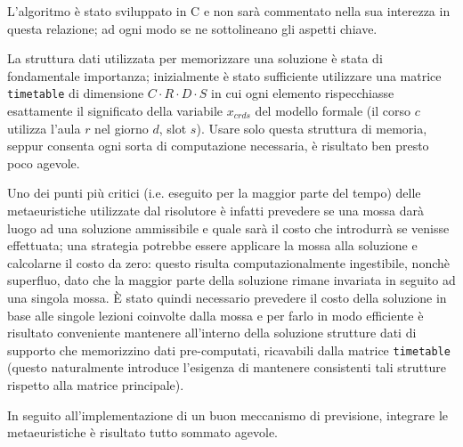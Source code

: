 \documentclass[]{article}
\newcommand{\E}{È }
\begin{document}
L'algoritmo è stato sviluppato in C e non sarà commentato nella sua interezza in questa relazione; ad ogni modo se ne sottolineano gli aspetti chiave.

La struttura dati utilizzata per memorizzare una soluzione è stata di fondamentale importanza; inizialmente è stato sufficiente utilizzare una matrice \texttt{timetable} di dimensione  $C \cdot R \cdot D \cdot S$ in cui ogni elemento rispecchiasse esattamente il significato della variabile $x_{crds}$ del modello formale (il corso $c$ utilizza l'aula $r$ nel giorno $d$, slot $s$). Usare solo questa struttura di memoria, seppur consenta ogni sorta di computazione necessaria, è risultato ben presto poco agevole.

Uno dei punti più critici (i.e. eseguito per la maggior parte del tempo) delle metaeuristiche utilizzate dal risolutore è infatti prevedere se una mossa darà luogo ad una soluzione ammissibile e quale sarà il costo che introdurrà se venisse effettuata; una strategia potrebbe essere applicare la mossa alla soluzione e calcolarne il costo da zero: questo risulta computazionalmente ingestibile, nonchè superfluo, dato che la maggior parte della soluzione rimane invariata in seguito ad una singola mossa. \E stato quindi necessario prevedere il costo della soluzione in base alle singole lezioni coinvolte dalla mossa e per farlo in modo efficiente è risultato conveniente mantenere all'interno della soluzione strutture dati di supporto che memorizzino dati pre-computati, ricavabili dalla matrice \texttt{timetable} (questo naturalmente introduce l'esigenza di mantenere consistenti tali strutture rispetto alla matrice principale).

In seguito all'implementazione di un buon meccanismo di previsione, integrare le metaeuristiche è risultato tutto sommato agevole.

\printbibliography
\end{document}
